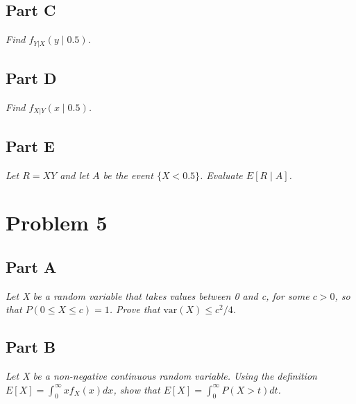 \documentclass{article}
\begin{document}
\subsection*{Part C}

\textit{Find $ f_{Y|X}(y \mid 0.5) $.}

\subsection*{Part D}

\textit{Find $ f_{X|Y}(x \mid 0.5) $.}

\subsection*{Part E}

\textit{Let $ R = XY $ and let $A$ be the event $ \{ X < 0.5 \} $. Evaluate $
E[R \mid A] $.}

\section*{Problem 5}

\subsection*{Part A}

\textit{Let X be a random variable that takes values between 0 and c, for
some $ c > 0 $, so that $P(0 \leq X \leq c) = 1$. Prove that $\mathrm{var}(X)
\leq c^2/4$.}

\subsection*{Part B}

\textit{Let X be a non-negative continuous random variable. Using the
definition $E[X] = \int_0^{\infty} x f_X(x) dx $, show that $ E[X] =
\int_0^{\infty} P(X > t) dt $.}
\end{document}
